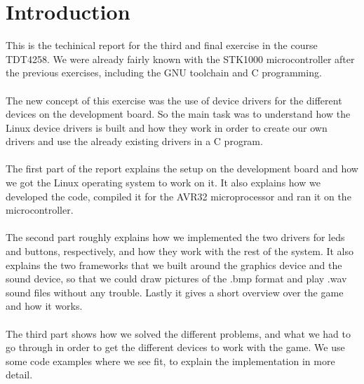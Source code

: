 \section{Introduction}
This is the techinical report for the third and
final exercise in the course TDT4258.
We were already fairly known with the STK1000 
microcontroller after the previous exercises, including the
GNU toolchain and C programming.\\
\\
The new concept of this exercise was the use of device 
drivers for the different devices on the development board.
So the main task was to understand how the Linux device
drivers is built and how they work in order to create our
own drivers and use the already existing drivers in a C program.\\
\\
The first part of the report explains the setup on the development
board and how we got the Linux operating system to work on it. It
also explains how we developed the code, compiled it for the AVR32 
microprocessor and ran it on the microcontroller.\\
\\
The second part roughly explains how we implemented the two drivers
for leds and buttons, respectively, and how they work with the rest
of the system.
It also explains the two frameworks that we built around the 
graphics device and the sound device, so that we could 
draw pictures of the .bmp format and play .wav sound files without
any trouble. Lastly it gives a short overview over the game and how
it works.\\
\\
The third part shows how we solved the different problems, and what
we had to go through in order to get the different devices to work 
with the game.
We use some code examples where we see fit, to explain the 
implementation in more detail.\\
\\